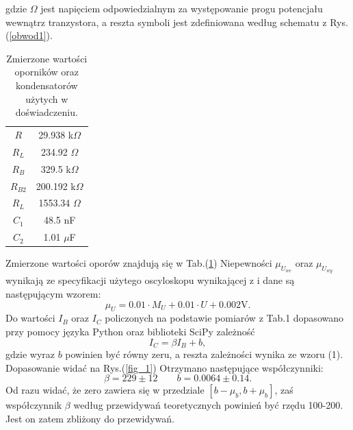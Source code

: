 \documentclass[10pt,a4paper]{article}
\begin{document}
gdzie $\Omega$ jest napięciem odpowiedzialnym za występowanie progu potencjału wewnątrz tranzystora, a reszta symboli jest zdefiniowana według schematu z Rys.(\ref{obwod1}).
\begin{table}[htp!]
\begin{center}
\begin{tabular}{|c|c|}
\hline
$R$ 						 & 29.938 k$\Omega$ 						\\
$R_L$                     & 234.92 $\Omega$                      \\
$R_B$                     & 329.5 k$\Omega$                       \\
$R_{B2}$                  & 200.192 k$\Omega$                     \\
$R_L$                     & 1553.34 $\Omega$                      \\
$C_1$                     & 48.5 nF                               \\
$C_2$                     & 1.01 $\mu$F        					\\
\hline                   
\end{tabular}
\end{center}
\caption{Zmierzone wartości oporników oraz kondensatorów użytych w doświadczeniu.}
\label{opory}
\end{table}
Zmierzone wartości oporów znajdują się w Tab.(\ref{opory})
Niepewności $\mu_{U_{we}}$ oraz $\mu_{U_{wy}}$ wynikają ze specyfikacji użytego oscyloskopu wynikającej z \cite{niepewnosci} i dane są następującym wzorem:
$$ \mu_{U} = 0.01 \cdot M_U + 0.01 \cdot U + 0.002\text{V}.$$
Do wartości $I_B$ oraz $I_C$ policzonych na podstawie pomiarów z Tab.1 dopasowano przy pomocy języka Python oraz biblioteki SciPy zależność 
$$ I_C = \beta I_B + b, $$
gdzie wyraz $b$ powinien być równy zeru, a reszta zależności wynika ze wzoru (1). Dopasowanie widać na Rys.(\ref{fig_1})
Otrzymano następujące współczynniki:
$$ \beta = 229 \pm 12 \qquad b = 
0.0064 \pm 0.14. $$
Od razu widać, że zero zawiera się w przedziale $[b - \mu_b, b + \mu_b]$, zaś współczynnik $\beta$ według przewidywań teoretycznych powinień być rzędu 100-200. Jest on zatem zbliżony do przewidywań. 
\end{document}
